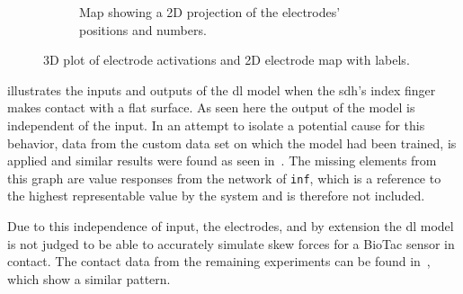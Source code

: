 \begin{figure}[!h]
\begin{subfigure}[b]{0.48\textwidth}
		\caption{Map showing a 2D projection of the electrodes' positions and numbers.}
		\label{fig:electrode-map}
	\end{subfigure}
		\caption{3D plot of electrode activations and 2D electrode map with labels.}
		\label{fig:flat-contact-experimental-and-electrode-map}
\end{figure}

\newpage

 illustrates the inputs and outputs of the \gls{dl} model when the \gls{sdh}'s index finger makes contact with a flat surface. As seen here the output of the model is independent of the input. In an attempt to isolate a potential cause for this behavior, data from the custom data set on which the model had been trained, is applied and similar results were found as seen in~. The missing elements from this graph are value responses from the network of \texttt{inf}, which is a reference to the highest representable value by the system and is therefore not included. \medskip

Due to this independence of input, the electrodes, and by extension the \gls{dl} model is not judged to be able to accurately simulate skew forces for a BioTac sensor in contact. The contact data from the remaining experiments can be found in~, which show a similar pattern.

\newpage

